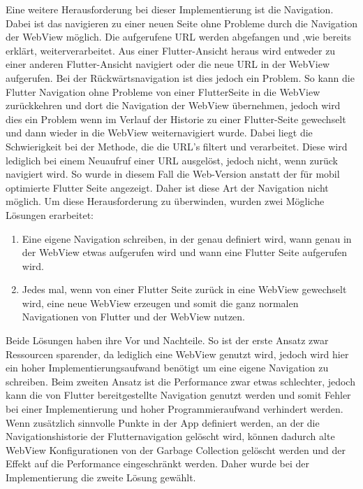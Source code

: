 Eine weitere Herausforderung bei dieser Implementierung ist die Navigation.
Dabei ist das navigieren zu einer neuen Seite ohne Probleme durch die Navigation der WebView möglich. Die aufgerufene URL werden abgefangen und ,wie bereits erklärt, weiterverarbeitet. Aus einer Flutter-Ansicht heraus wird entweder zu einer anderen Flutter-Ansicht navigiert oder die neue URL in der WebView aufgerufen. Bei der Rückwärtsnavigation ist dies jedoch ein Problem. So kann die Flutter Navigation ohne Probleme von einer FlutterSeite in die WebView zurückkehren und dort die Navigation der WebView übernehmen, jedoch wird dies ein Problem wenn im Verlauf der Historie zu einer Flutter-Seite gewechselt und dann wieder in die WebView weiternavigiert wurde. Dabei liegt die Schwierigkeit bei der Methode, die die URL's filtert und verarbeitet. Diese wird lediglich bei einem Neuaufruf einer URL ausgelöst, jedoch nicht, wenn zurück navigiert wird. So wurde in diesem Fall die Web-Version anstatt der für mobil optimierte Flutter Seite angezeigt. Daher ist diese Art der Navigation nicht möglich.
Um diese Herausforderung zu überwinden, wurden zwei Mögliche Lösungen erarbeitet:
\begin{enumerate}
    \item Eine eigene Navigation schreiben, in der genau definiert wird, wann genau in der WebView etwas aufgerufen wird und wann eine Flutter Seite aufgerufen wird. 
    \item Jedes mal, wenn von einer Flutter Seite zurück in eine WebView gewechselt wird, eine neue WebView erzeugen und somit die ganz normalen Navigationen von Flutter und der WebView nutzen. 
\end{enumerate}

Beide Lösungen haben ihre Vor und Nachteile. So ist der erste Ansatz zwar Ressourcen sparender, da lediglich eine WebView genutzt wird, jedoch wird hier ein hoher Implementierungsaufwand benötigt um eine eigene Navigation zu schreiben. 
Beim zweiten Ansatz ist die Performance zwar etwas schlechter, jedoch kann die von Flutter bereitgestellte Navigation genutzt werden und somit Fehler bei einer Implementierung und hoher Programmieraufwand verhindert werden.
Wenn zusätzlich sinnvolle Punkte in der App definiert werden, an der die Navigationshistorie der Flutternavigation gelöscht wird, können dadurch alte WebView Konfigurationen von der Garbage Collection gelöscht werden und der Effekt auf die Performance eingeschränkt werden. Daher wurde bei der Implementierung die zweite Lösung gewählt. 

